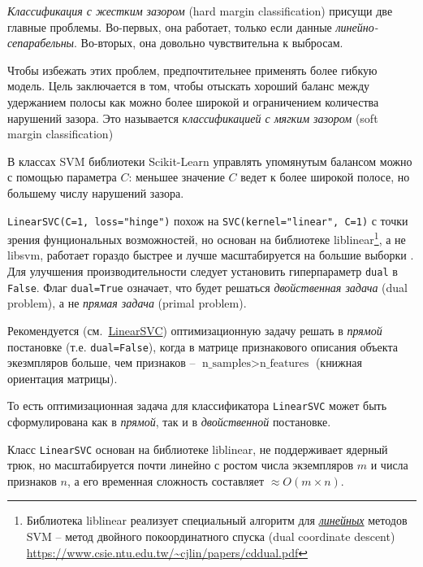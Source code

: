 \documentclass[%
	11pt,
	a4paper,
	utf8,
		]{article}
\begin{document}
\emph{Классификация с жестким зазором} (hard margin classification) присущи две главные проблемы. Во-первых, она работает, только если данные \emph{линейно-сепарабельны}. Во-вторых, она довольно чувствительна к выбросам.

Чтобы избежать этих проблем, предпочтительнее применять более гибкую модель. Цель заключается в том, чтобы отыскать хороший баланс между удержанием полосы как можно более широкой и ограничением количества нарушений зазора. Это называется \emph{классификацией с мягким зазором} (soft margin classification)

В классах SVM библиотеки Scikit-Learn управлять упомянутым балансом можно с помощью параметра $ C $: меньшее значение $ C $ ведет к более широкой полосе, но большему числу нарушений зазора.

\verb|LinearSVC(C=1, loss="hinge")| похож на \verb|SVC(kernel="linear", C=1)| с точки зрения фунциональных возможностей, но основан на библиотеке liblinear\footnote{Библиотека liblinear реализует специальный алгоритм для \underline{\itshape линейных} методов SVM -- метод двойного покоординатного спуска (dual coordinate descent) \url{https://www.csie.ntu.edu.tw/~cjlin/papers/cddual.pdf}}, а не libsvm, работает гораздо быстрее и лучше масштабируется на большие выборки \cite[]{geron:hands_on_ml}. Для улучшения производительности следует установить гиперпараметр \verb|dual| в \verb|False|. Флаг \verb|dual=True| означает, что будет решаться \emph{двойственная задача} (dual problem), а не \emph{прямая задача} (primal problem).

Рекомендуется (см.~\href{https://scikit-learn.org/stable/modules/generated/sklearn.svm.LinearSVC.html}{LinearSVC}) оптимизационную задачу решать в \emph{прямой} постановке (т.е. \verb|dual=False|), когда в матрице признакового описания объекта экезмпляров больше, чем признаков -- $ \text{n\_samples} > \text{n\_features} $ (книжная ориентация матрицы).

То есть оптимизационная задача для классификатора \verb|LinearSVC| может быть сформулирована как в \emph{прямой}, так и в \emph{двойственной} постановке.


Класс \verb|LinearSVC| основан на библиотеке liblinear, не поддерживает ядерный трюк, но масштабируется почти линейно с ростом числа экземпляров $ m $ и числа признаков $ n $, а его временная сложность составляет $ \approx O(m \times n) $.
\end{document}
